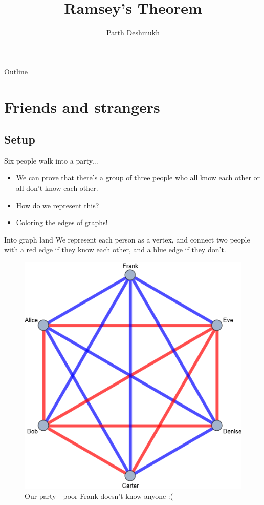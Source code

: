 \documentclass[aspectratio=169]{beamer}
\title{Ramsey's Theorem}
\author{Parth Deshmukh}
\date{}
\begin{document}

\begin{frame}
\titlepage
\end{frame}

\begin{frame}{Outline}
  \tableofcontents
\end{frame}

\section{Friends and strangers}
\frame{\sectionpage}

\subsection{Setup} %
\begin{frame}{Six people walk into a party...}
    
    \begin{itemize}
        \item We can prove that there's a group of three people who all know each other or all don't know each other. \pause
        \item How do we represent this? \pause
        \item {\color{sigma@alertred} Coloring the edges of graphs!}
    \end{itemize}

    
\end{frame}

\begin{frame}{Into graph land}
    We represent each person as a vertex, and connect two people with a \textcolor{sigma@alertred}{red edge} if they know each other, and a \textcolor{sigma@mainblue}{blue edge} if they don't.
    
    \begin{figure}
        \centering
        \includegraphics[width=0.4\columnwidth]{images/exampler33k6.png}
        \caption{Our party - poor Frank doesn't know anyone :(}
    \end{figure}
\end{frame}
\end{document}
